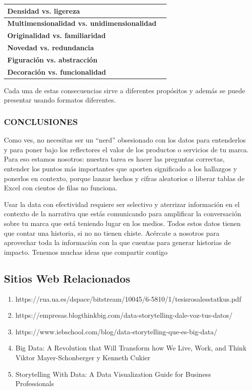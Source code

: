 \documentclass[a4paper,12pt,twocolumn]{article}
\begin{document}
\begin{center}
\begin{tabular}{|l|r|}\hline
\textbf{Densidad vs. ligereza}\\\hline
\textbf{Multimensionalidad vs. unidimensionalidad}\\\hline
\textbf{Originalidad vs. familiaridad} \\\hline
\textbf{Novedad vs. redundancia}\\\hline
\textbf{Figuración vs. abstracción} \\\hline
\textbf{Decoración vs. funcionalidad}\\\hline
\end{tabular}
\end{center}
Cada una de estas consecuencias sirve a diferentes propósitos y además se puede presentar usando formatos diferentes.
\textbf{}\\

\subsubsection*{CONCLUSIONES} 
\item Como ves, no necesitas ser un “nerd” obsesionado con los datos para entenderlos y para poner bajo los reflectores el valor de los productos o servicios de tu marca. Para eso estamos nosotros: nuestra tarea es hacer las preguntas correctas, entender los puntos más importantes que aporten significado a los hallazgos y ponerlos en contexto, porque lanzar hechos y cifras aleatorios o liberar tablas de Excel con cientos de filas no funciona. 

\item Usar la data con efectividad requiere ser selectivo y aterrizar información en el contexto de la narrativa que estás comunicando para amplificar la conversación sobre tu marca que está teniendo lugar en los medios. Todos estos datos tienen que contar una historia, si no no tienen chiste. Acércate a nosotros para aprovechar toda la información con la que cuentas para generar historias de impacto. Tenemos muchas ideas que compartir contigo  


\subsection*{Sitios Web Relacionados}
\begin{enumerate}
\item https://rua.ua.es/dspace/bitstream/10045/6-5810/1/tesisrosalesstatkus.pdf
\item https://empresas.blogthinkbig.com/data-storytelling-dale-voz-tus-datos/
\item https://www.iebschool.com/blog/data-storytelling-que-es-big-data/
\item Big Data: A Revolution that Will Transform how We Live, Work, and Think Viktor Mayer-Schonberger y Kenneth Cukier
\item Storytelling With Data: A Data Visualization Guide for Business Professionals
\end{enumerate}
\end{document}
